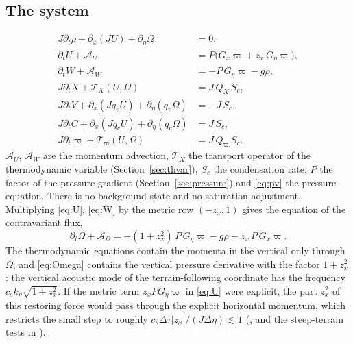 \documentclass[11pt,a4paper]{article}
\newcommand{\dtau}{\Delta\tau}
\newcommand{\pv}{\varpi}      %
\begin{document}
\subsection{The system}
\begin{align}
J\partial_t\rho+\partial_x(JU)+\partial_\eta\Omega&=0,\label{eq:rho}\\
\partial_tU+\mathcal A_U&=P\big(G_x\pv+z_x\,G_\eta\pv\big),\label{eq:U}\\
\partial_tW+\mathcal A_W&=-P\,G_\eta\pv-g\rho,\label{eq:W}\\
J\partial_tX+\mathcal T_X(U,\Omega)&=J\,Q_X\,S_c,\label{eq:X}\\
J\partial_tV+\partial_x(Jq_vU)+\partial_\eta(q_v\Omega)&=-J\,S_c,\label{eq:V}\\
J\partial_tC+\partial_x(Jq_cU)+\partial_\eta(q_c\Omega)&=J\,S_c,\label{eq:C}\\
J\partial_t\pv+\mathcal T_\pv(U,\Omega)&=J\,Q_\pv\,S_c.\label{eq:pv}
\end{align}
$\mathcal A_U$, $\mathcal A_W$ are the momentum advection, $\mathcal T_X$ the transport operator of the
thermodynamic variable (Section~\ref{sec:thvar}), $S_c$ the condensation rate, $P$ the factor of the
pressure gradient (Section~\ref{sec:pressure}) and \eqref{eq:pv} the pressure equation. There is no
background state and no saturation adjustment. Multiplying \eqref{eq:U}, \eqref{eq:W} by the metric row
$(-z_x,1)$ gives the equation of the contravariant flux,
\begin{equation}
\partial_t\Omega+\mathcal A_\Omega=-(1+z_x^2)\,P\,G_\eta\pv-g\rho-z_x\,P\,G_x\pv .\label{eq:Omega}
\end{equation}
The thermodynamic equations contain the momenta in the vertical only through $\Omega$, and
\eqref{eq:Omega} contains the vertical pressure derivative with the factor $1+z_x^2$: the vertical
acoustic mode of the terrain-following coordinate has the frequency $c_sk_\eta\sqrt{1+z_x^2}$. If the
metric term $z_xPG_\eta\pv$ in \eqref{eq:U} were explicit, the part $z_x^2$ of this restoring force
would pass through the explicit horizontal momentum, which restricts the small step to roughly
$c_s\dtau|z_x|/(J\Delta\eta)\lesssim1$ (\cite{schaer}, and the steep-terrain tests in \cite{verletei}).
\end{document}
